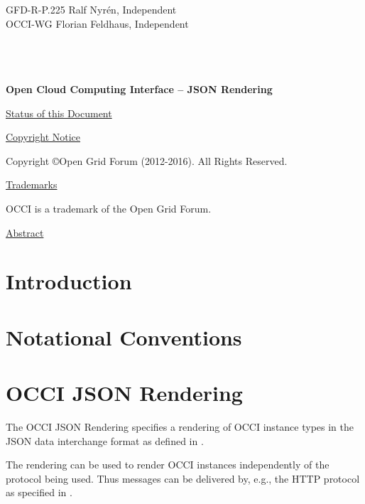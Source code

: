 \documentclass[10pt,a4paper]{article}
\begin{document}
\thispagestyle{empty}

GFD-R-P.225 \hfill Ralf Nyrén, Independent \\
OCCI-WG \hfill Florian Feldhaus, Independent\\
\\
\\
\\

\vspace*{0.5in}

\begin{Large}
\textbf{Open Cloud Computing Interface -- JSON Rendering}
\end{Large}

\vspace*{0.5in}

\underline{Status of this Document}



\underline{Copyright Notice}

Copyright \copyright Open Grid Forum (2012-2016). All Rights Reserved.

\underline{Trademarks}

OCCI is a trademark of the Open Grid Forum.

\underline{Abstract}



\newpage
\tableofcontents
\newpage

\section{Introduction}


\section{Notational Conventions}


\section{OCCI JSON Rendering}
\label{sec:json_format}
The OCCI JSON Rendering specifies a rendering of OCCI instance types in the JSON
data interchange format as defined in \cite{rfc4627}.

The rendering can be used to render OCCI instances independently of the
protocol being used. Thus messages can be delivered by, e.g., the HTTP
protocol as specified in \cite{occi:http_protocol}.
\end{document}
